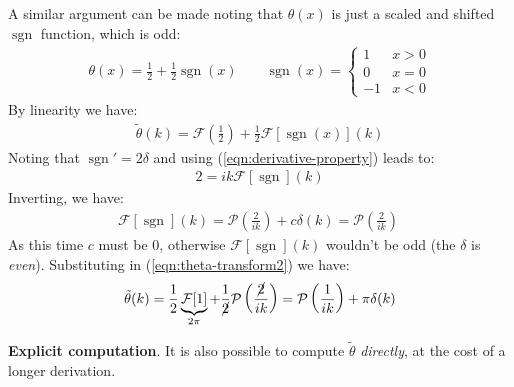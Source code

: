 \documentclass[../template.tex]{subfiles}
\begin{document}
\medskip

A similar argument can be made noting that $\theta(x)$ is just a scaled and shifted $\operatorname{sgn}$ function, which is odd:
\begin{align*}
    \theta(x) = \frac{1}{2} +  \frac{1}{2}\operatorname{sgn}(x) \qquad
    \operatorname{sgn}(x) = \begin{cases}
        1 & x > 0\\
        0 & x = 0\\
        -1 & x < 0
    \end{cases} 
\end{align*} 
By linearity we have:
\begin{align}
    \tilde{\theta}(k) = \mathcal{F}\left(\frac{1}{2}\right) + \frac{1}{2} \mathcal{F}[\operatorname{sgn}(x)](k) \label{eqn:theta-transform2}
\end{align}
Noting that $\operatorname{sgn}' = 2 \delta$ and using (\ref{eqn:derivative-property}) leads to:
\begin{align*}
    2 = ik \mathcal{F}[\operatorname{sgn}](k)
\end{align*}
Inverting, we have:
\begin{align*}
    \mathcal{F}[\operatorname{sgn}](k) = \mathcal{P}\left(\frac{2}{ik} \right) + c \delta(k) =\mathcal{P}\left(\frac{2}{ik} \right) \ 
\end{align*}
As this time $c$ must be $0$, otherwise $\mathcal{F}[\operatorname{sgn}](k)$ wouldn't be odd (the $\delta$ is \textit{even}). Substituting in (\ref{eqn:theta-transform2}) we have:
\begin{align*}
    \tilde{\theta}(k) = \frac{1}{2} \underbrace{\mathcal{F}[1] }_{2 \pi}+\frac{1}{\cancel{2}} \mathcal{P}\left(\frac{\cancel{2}}{ik} \right) = \mathcal{P}\left(\frac{1}{ik} \right)  + \pi \delta(k)
\end{align*}

\begin{expl}
    \textbf{Explicit computation}. It is also possible to compute $\tilde{\theta}$ \textit{directly}, at the cost of a longer derivation.  
\end{expl}



\end{document}
